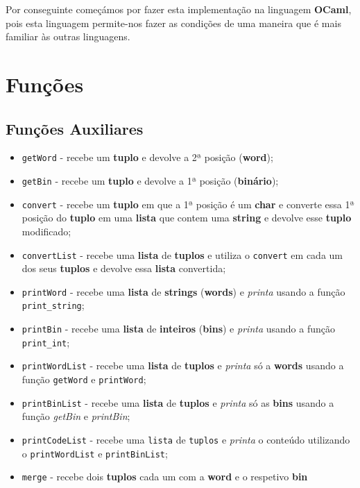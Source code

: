 \documentclass[11pt]{article}   %
\begin{document}
Por conseguinte começámos por fazer esta implementação na linguagem \textbf{OCaml}, pois esta
linguagem permite-nos fazer as condições de uma maneira que é mais familiar às outras linguagens.
\newpage
\section{Funções}

\subsection{Funções Auxiliares}

\begin{itemize}
    \item \verb|getWord| - recebe um \textbf{tuplo} e devolve a 2ª posição (\textbf{word});
    \item \verb|getBin| - recebe um \textbf{tuplo} e devolve a 1ª posição (\textbf{binário});
    \item \verb|convert| - recebe um \textbf{tuplo} em que a 1ª posição é um \textbf{char} e 
    converte essa 1ª posição do \textbf{tuplo} em uma \textbf{lista} que contem uma \textbf{string}
    e devolve esse \textbf{tuplo} modificado;
    \item \verb|convertList| - recebe uma \textbf{lista} de \textbf{tuplos} e utiliza o \verb|convert|
    em cada um dos seus \textbf{tuplos} e devolve essa \textbf{lista} convertida;
    \item \verb|printWord| - recebe uma \textbf{lista} de \textbf{strings} (\textbf{words}) e 
    \textit{printa} usando a função \verb|print_string|;
    \item \verb|printBin| - recebe uma \textbf{lista} de \textbf{inteiros} (\textbf{bins}) e 
    \textit{printa} usando a função \verb|print_int|;
    \item \verb|printWordList| - recebe uma \textbf{lista} de \textbf{tuplos} e \textit{printa} só a 
    \textbf{words} usando a função \verb|getWord| e \verb|printWord|;
    \item \verb|printBinList| - recebe uma \textbf{lista} de \textbf{tuplos} e \textit{printa} só as 
    \textbf{bins} usando a função \textit{getBin} e \textit{printBin};
    \item \verb|printCodeList| - recebe uma \verb|lista| de \verb|tuplos| e \textit{printa} o conteúdo
    utilizando o \verb|printWordList| e \verb|printBinList|;
    \item \verb|merge| - recebe dois \textbf{tuplos} cada um com a \textbf{word} e o respetivo \textbf{bin}

\end{itemize}
\end{document}

